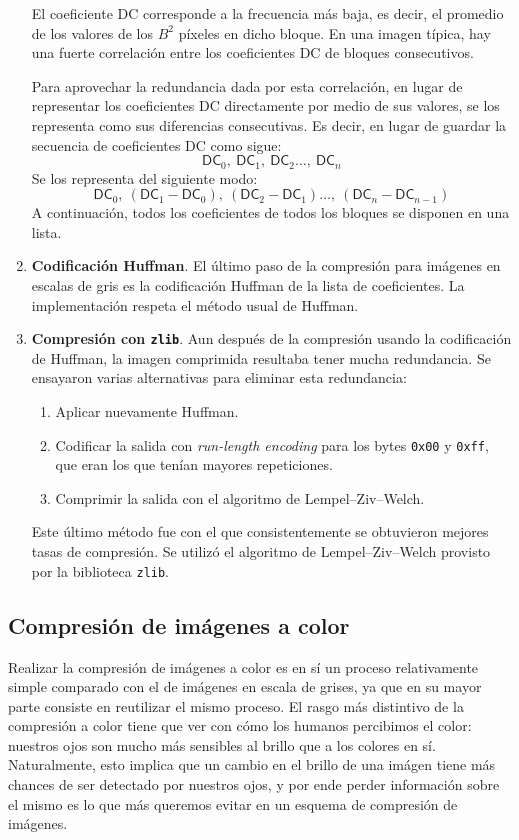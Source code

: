 \documentclass{article}
\begin{document}
\begin{enumerate}
  El coeficiente DC corresponde a la frecuencia más baja, es
  decir, el promedio de los valores de los $B^2$ píxeles en
  dicho bloque.
  En una imagen típica, hay una fuerte correlación entre los
  coeficientes DC de bloques consecutivos.

  Para aprovechar la redundancia dada por esta correlación,
  en lugar de representar los coeficientes DC directamente por
  medio de sus valores,
  se los representa como sus diferencias consecutivas.
  Es decir, en lugar de guardar la secuencia de coeficientes
  DC como sigue:
  \[
    \mathsf{DC}_0,\ \mathsf{DC}_1,\ \mathsf{DC}_2 \hdots,\ \mathsf{DC}_n
  \]
  Se los representa del siguiente modo:
  \[
    \mathsf{DC}_0,\ (\mathsf{DC}_1 - \mathsf{DC}_0),\ (\mathsf{DC}_2 - \mathsf{DC}_1) \hdots,\ (\mathsf{DC}_n - \mathsf{DC}_{n-1})
  \]
  A continuación, todos los coeficientes de todos los bloques
  se disponen en una lista.
\item
  {\bf Codificación Huffman}.
  El último paso de la compresión para imágenes en escalas de
  gris es la codificación Huffman de la lista de coeficientes.
  La implementación respeta el método usual de Huffman.
\item
  {\bf Compresión con \texttt{zlib}}.
  Aun después de la compresión usando la codificación de Huffman,
  la imagen comprimida resultaba tener mucha redundancia.
  Se ensayaron varias alternativas para eliminar esta redundancia:
  \begin{enumerate}
  \item Aplicar nuevamente Huffman.
  \item Codificar la salida con {\em run-length encoding} para los bytes \texttt{0x00} y \texttt{0xff},
        que eran los que tenían mayores repeticiones.
  \item Comprimir la salida con el algoritmo de Lempel--Ziv--Welch.
  \end{enumerate}
  Este último método fue con el que consistentemente se obtuvieron mejores tasas de compresión.
  Se utilizó el algoritmo de Lempel--Ziv--Welch provisto por la biblioteca \texttt{zlib}.
\end{enumerate}

\subsection{Compresión de imágenes a color}

Realizar la compresión de imágenes a color es en sí un proceso relativamente simple comparado con el de imágenes en escala de grises, ya que en su mayor parte consiste en reutilizar el mismo proceso. El rasgo más distintivo de la compresión a color tiene que ver con cómo los humanos percibimos el color: nuestros ojos son mucho más sensibles al brillo que a los colores en sí. Naturalmente, esto implica que un cambio en el brillo de una imágen tiene más chances de ser detectado por nuestros ojos, y por ende perder información sobre el mismo es lo que más queremos evitar en un esquema de compresión de imágenes.
\end{document}

